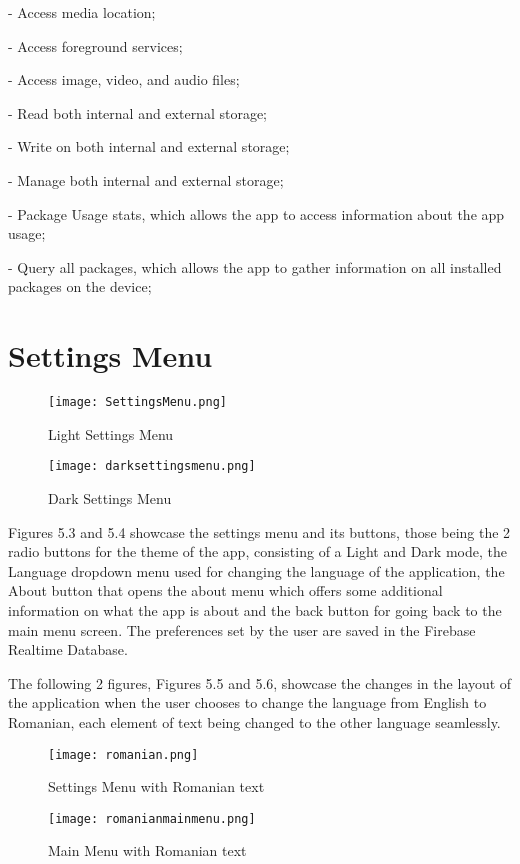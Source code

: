    - Access media location;

    - Access foreground services;

    - Access image, video, and audio files;

    - Read both internal and external storage;

    - Write on both internal and external storage;

    - Manage both internal and external storage;

    - Package Usage stats, which allows the app to access information about the app usage;

    - Query all packages, which allows the app to gather information on all installed packages on the device;

\section{Settings Menu}\label{sect:Settings Menu}

\begin{figure}[htp]
    \centering
    \begin{minipage}{0.45\textwidth}
        \centering
        \texttt{[image: SettingsMenu.png]}
        \caption{Light Settings Menu}
        \label{fig: Light Settings Menu}
    \end{minipage}\hfill
    \begin{minipage}{0.45\textwidth}
        \centering
        \texttt{[image: darksettingsmenu.png]}
        \caption{Dark Settings Menu}
        \label{fig: Dark Settings Menu}
    \end{minipage}
\end{figure}
\newpage
Figures 5.3 and 5.4 showcase the settings menu and its buttons, those being the 2 radio buttons for the theme of the app, consisting of a Light and Dark mode, the Language dropdown menu used for changing the language of the application, the About button that opens the about menu which offers some additional information on what the app is about and the back button for going back to the main menu screen. The preferences set by the user are saved in the Firebase Realtime Database. 

The following 2 figures, Figures 5.5 and 5.6, showcase the changes in the layout of the application when the user chooses to change the language from English to Romanian, each element of text being changed to the other language seamlessly.

\begin{figure}[htp]
    \centering
    \begin{minipage}{0.45\textwidth}
        \centering
        \texttt{[image: romanian.png]}
        \caption{Settings Menu with Romanian text}
        \label{fig: Settings Menu with Romanian text}
    \end{minipage}\hfill
    \begin{minipage}{0.45\textwidth}
        \centering
        \texttt{[image: romanianmainmenu.png]}
        \caption{Main Menu with Romanian text}
        \label{fig: Main Menu with Romanian text}
    \end{minipage}
\end{figure}
\newpage

